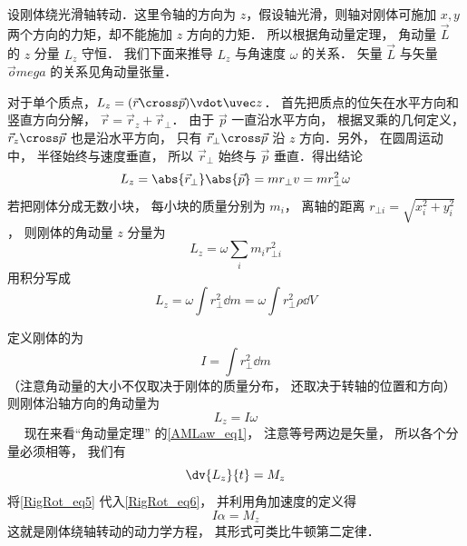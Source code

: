 

设刚体绕光滑轴转动．这里令轴的方向为 $z$，假设轴光滑，则轴对刚体可施加 $x, y$ 两个方向的力矩，却不能施加 $z$ 方向的力矩． 所以根据角动量定理， 角动量 $\vec L$ 的 $z$ 分量 $L_z$ 守恒． 我们下面来推导 $L_z$ 与角速度 $\omega$ 的关系． 矢量 $\vec L$ 与矢量 $\vec omega$ 的关系见角动量张量．

对于单个质点，$L_z = ( \vec r \cross \vec p ) \vdot \uvec z$． 首先把质点的位矢在水平方向和竖直方向分解， $\vec r = \vec r_z + \vec r_ \bot$． 由于 $\vec p$ 一直沿水平方向， 根据叉乘的几何定义， $\vec r_z \cross \vec p$ 也是沿水平方向， 只有 $\vec r_ \bot \cross \vec p$ 沿 $z$ 方向．另外， 在圆周运动中， 半径始终与速度垂直， 所以 $\vec r_ \bot$ 始终与 $\vec p$ 垂直．得出结论
\begin{equation}
L_z = \abs{\vec r_\bot} \abs{\vec p} = m r_ \bot v = mr_ \bot ^2\omega 
\end{equation}
若把刚体分成无数小块， 每小块的质量分别为 $m_i$， 离轴的距离 $r_{\bot i} = \sqrt{x_i^2 + y_i^2} $， 则刚体的角动量 $z$ 分量为
\begin{equation}
L_z = \omega \sum_i m_i r_{ \bot i}^2
\end{equation}
用积分写成
\begin{equation}
L_z = \omega \int r_ \bot ^2 \dd{m} = \omega \int r_ \bot ^2\rho  \dd{V} 
\end{equation}

定义刚体的为
\begin{equation}
I = \int r_ \bot ^2 \dd{m} 
\end{equation}
（注意角动量的大小不仅取决于刚体的质量分布， 还取决于转轴的位置和方向）则刚体沿轴方向的角动量为
\begin{equation}\label{RigRot_eq5}
L_z = I\omega 
\end{equation}
 
现在来看“角动量定理” 的\autoref{AMLaw_eq1}， 注意等号两边是矢量， 所以各个分量必须相等， 我们有
\begin{equation}\label{RigRot_eq6}
\dv{L_z}{t} = M_z
\end{equation}
将\autoref{RigRot_eq5} 代入\autoref{RigRot_eq6}， 并利用角加速度的定义得
\begin{equation}\label{RigRot_eq7}
I\alpha = M_z
\end{equation}
这就是刚体绕轴转动的动力学方程， 其形式可类比牛顿第二定律．

